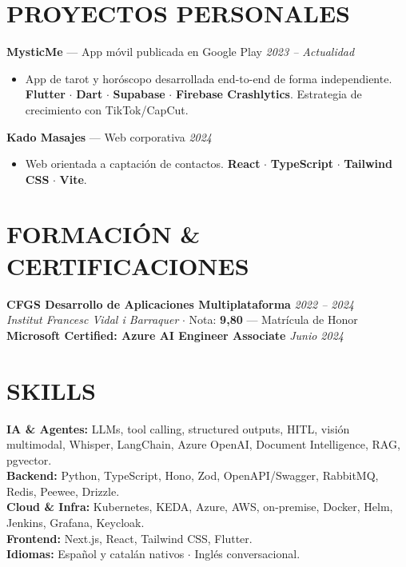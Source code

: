 \documentclass[11pt,a4paper]{article}
\begin{document}
\section*{PROYECTOS PERSONALES}

\textbf{MysticMe} --- App móvil publicada en Google Play \hfill \textit{2023 -- Actualidad}\\[0.12em]
\begin{itemize}
    \item App de tarot y horóscopo desarrollada end-to-end de forma independiente. \textbf{Flutter} $\cdot$ \textbf{Dart} $\cdot$ \textbf{Supabase} $\cdot$ \textbf{Firebase Crashlytics}. Estrategia de crecimiento con TikTok/CapCut.
\end{itemize}

\vspace{0.45em}
\textbf{Kado Masajes} --- Web corporativa \hfill \textit{2024}\\[0.12em]
\begin{itemize}
    \item Web orientada a captación de contactos. \textbf{React} $\cdot$ \textbf{TypeScript} $\cdot$ \textbf{Tailwind CSS} $\cdot$ \textbf{Vite}.
\end{itemize}

\section*{FORMACIÓN \& CERTIFICACIONES}

\textbf{CFGS Desarrollo de Aplicaciones Multiplataforma} \hfill \textit{2022 -- 2024}\\[0.12em]
\textit{Institut Francesc Vidal i Barraquer} $\cdot$ Nota: \textbf{9,80} --- Matrícula de Honor\\[0.55em]
\textbf{Microsoft Certified: Azure AI Engineer Associate} \hfill \textit{Junio 2024}

\section*{SKILLS}
\textbf{IA \& Agentes:} LLMs, tool calling, structured outputs, HITL, visión multimodal, Whisper, LangChain, Azure OpenAI, Document Intelligence, RAG, pgvector.\\
\textbf{Backend:} Python, TypeScript, Hono, Zod, OpenAPI/Swagger, RabbitMQ, Redis, Peewee, Drizzle.\\
\textbf{Cloud \& Infra:} Kubernetes, KEDA, Azure, AWS, on-premise, Docker, Helm, Jenkins, Grafana, Keycloak.\\
\textbf{Frontend:} Next.js, React, Tailwind CSS, Flutter.\\
\textbf{Idiomas:} Español y catalán nativos $\cdot$ Inglés conversacional.
\end{document}
